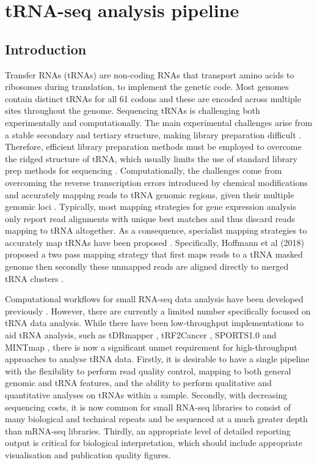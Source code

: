 \section{tRNA-seq analysis pipeline}\label{sec:trna_methods}

\subsection{Introduction}
Transfer RNAs (tRNAs) are non-coding RNAs that transport amino acids to ribosomes during translation, to implement the genetic code.
Most genomes contain distinct tRNAs for all 61 codons and these are encoded across multiple sites throughout the genome.
Sequencing tRNAs is challenging both experimentally and computationally.
The main experimental challenges arise from a stable secondary and tertiary structure, making library preparation difficult \cite{kim1973three}.
Therefore, efficient library preparation methods must be employed to overcome the ridged structure of tRNA, which usually limits the use of standard library prep methods for sequencing \cite{shigematsu2017yamat}.
Computationally, the challenges come from overcoming the reverse transcription errors introduced by chemical modifications and accurately mapping reads to tRNA genomic regions, given their multiple genomic loci \cite{hoffmann2018accurate}.
Typically, most mapping strategies for gene expression analysis only report read alignments with unique best matches and thus discard reads mapping to tRNA altogether.
As a consequence, specialist mapping strategies to accurately map tRNAs have been proposed \cite{selitsky2015tdrmapper, loher2017mintmap, gebert2017unitas}.
Specifically, Hoffmann et al (2018) proposed a two pass mapping strategy that first maps reads to a tRNA masked genome then secondly these unmapped reads are aligned directly to merged tRNA clusters \cite{hoffmann2018accurate}.

Computational workflows for small RNA-seq data analysis have been developed previously \cite{wu2017srnanalyzer}.
However, there are currently a limited number specifically focused on tRNA data analysis.
While there have been low-throughput implementations to aid tRNA analysis, such as tDRmapper \cite{selitsky2015tdrmapper}, tRF2Cancer \cite{zheng2016trf2cancer}, SPORTS1.0 \cite{shi2018sports1} and MINTmap \cite{loher2017mintmap}, there is now a significant unmet requirement for high-throughput approaches to analyse tRNA data.
Firstly, it is desirable to have a single pipeline with the flexibility to perform read quality control, mapping to both general genomic and tRNA features, and the ability to perform qualitative and quantitative analyses on tRNAs within a sample.
Secondly, with decreasing sequencing costs, it is now common for small RNA-seq libraries to consist of many biological and technical repeats and be sequenced at a much greater depth than mRNA-seq libraries.
Thirdly, an appropriate level of detailed reporting output is critical for biological interpretation, which should include appropriate visualisation and publication quality figures.

